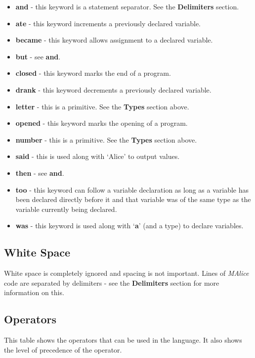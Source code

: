 \documentclass[a4, 11pt]{article}
\begin{document}
\begin{itemize}
  \item \textbf{and} - this keyword is a statement separator. See the \textbf{Delimiters} section.
  \item \textbf{ate} - this keyword increments a previously declared variable.
  \item \textbf{became} - this keyword allows assignment to a declared variable.
  \item \textbf{but} - see \textbf{and}.
  \item \textbf{closed} - this keyword marks the end of a program.
  \item \textbf{drank} - this keyword decrements a previously declared variable.
  \item \textbf{letter} - this is a primitive. See the \textbf{Types} section above.
  \item \textbf{opened} - this keyword marks the opening of a program.
  \item \textbf{number} - this is a primitive. See the \textbf{Types} section above.
  \item \textbf{said} - this is used along with \textquoteleft Alice\textquoteright{} to output values.
  \item \textbf{then} - see \textbf{and}.
  \item \textbf{too} - this keyword can follow a variable declaration as long as a variable has been declared directly before it and that variable was of the same type as the variable currently being declared.
  \item \textbf{was} - this keyword is used along with \textquoteleft \textbf{a}\textquoteright{} (and a type) to declare variables.
\end{itemize}

\subsection*{White Space}
White space is completely ignored and spacing is not important. Lines of \emph{MAlice} code are separated by delimiters - see the \textbf{Delimiters} section for more information on this.

\subsection*{Operators}
This table shows the operators that can be used in the language. It also shows the level of precedence of the operator.
\end{document}
